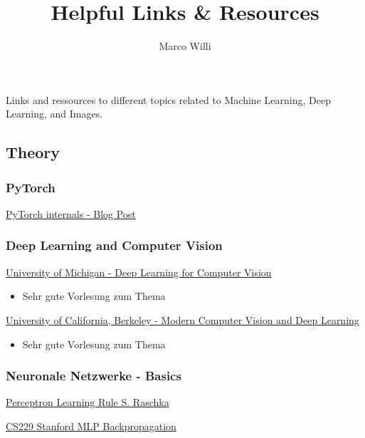 \documentclass[
  letterpaper,
  DIV=11,
  numbers=noendperiod]{scrartcl}
\title{Helpful Links \& Resources}
\author{Marco Willi}
\date{}
\providecommand{\tightlist}{%
  \setlength{\itemsep}{0pt}\setlength{\parskip}{0pt}}\usepackage{longtable,booktabs,array}
\begin{document}
\maketitle


Links and ressources to different topics related to Machine Learning,
Deep Learning, and Images.

\subsection{Theory}\label{theory}

\subsubsection{PyTorch}\label{pytorch}

\href{http://blog.ezyang.com/2019/05/pytorch-internals/}{PyTorch
internals - Blog Post}

\subsubsection{Deep Learning and Computer
Vision}\label{deep-learning-and-computer-vision}

\href{https://www.youtube.com/playlist?list=PL5-TkQAfAZFbzxjBHtzdVCWE0Zbhomg7r}{University
of Michigan - Deep Learning for Computer Vision}

\begin{itemize}
\tightlist
\item
  Sehr gute Vorlesung zum Thema
\end{itemize}

\href{https://fluff-armadillo-037.notion.site/Modern-Computer-Vision-and-Deep-Learning-CS-198-126-b11006739378470fa67a9cf6594201e0}{University
of California, Berkeley - Modern Computer Vision and Deep Learning}

\begin{itemize}
\tightlist
\item
  Sehr gute Vorlesung zum Thema
\end{itemize}

\subsubsection{Neuronale Netzwerke - Basics}\label{sec-links-nn}

\href{https://www.youtube.com/watch?v=C8Uns9HEVXI}{Perceptron Learning
Rule S. Raschka}

\href{https://cs229.stanford.edu/notes2020spring/cs229-notes-deep_learning.pdf}{CS229
Stanford MLP Backpropagation}
\end{document}
